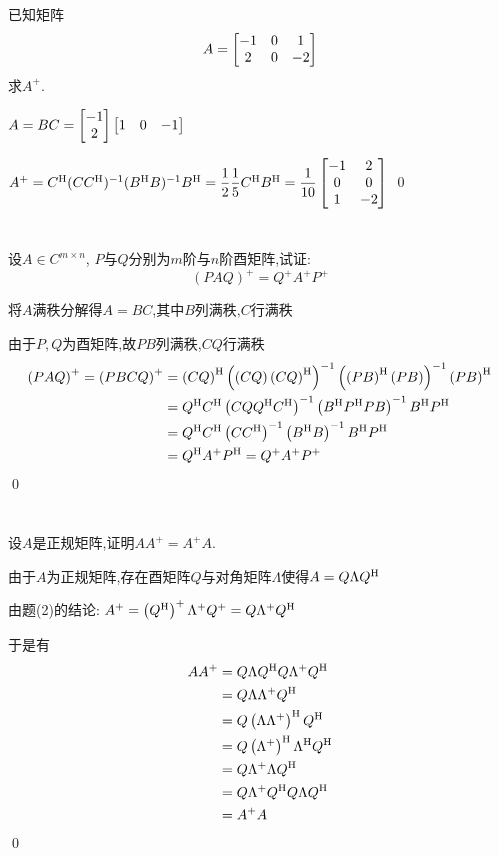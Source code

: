 \documentclass{matrix-homework}
\begin{document}

\section{}
已知矩阵$$A=\begin{bmatrix}-1&0&1\\2&0&-2\end{bmatrix}$$求$A^+$.

\answer
$A=BC=\begin{bmatrix}-1\\2\end{bmatrix}\begin{bmatrix}1&0&-1\end{bmatrix}$

$A^+=C^{\mathrm{H}} (CC^{\mathrm{H}})^{-1}(B^{\mathrm{H}} B)^{-1}B^{\mathrm{H}}=\dfrac{1}{2}\dfrac{1}{5}C^{\mathrm{H}} B^{\mathrm{H}}=\dfrac{1}{10}\begin{bmatrix}-1&2\\0&0\\1&-2\end{bmatrix}$
\qed


\section{}
设$A\in C^{m\times n}$, $P$与$Q$分别为$m$阶与$n$阶酉矩阵,试证:$$(PAQ)^+=Q^+A^+P^+$$

\answer
将$A$满秩分解得$A=BC$,其中$B$列满秩,$C$行满秩

由于$P,Q$为酉矩阵,故$PB$列满秩,$CQ$行满秩
\begin{align*}
    \left(PAQ\right)^+
    =\left(PBCQ\right)^+
     & =\left(CQ\right)^{\mathrm{H}} \left(\left(CQ\right)\left(CQ\right)^{\mathrm{H}}\right)^{-1} \left(\left(PB\right)^{\mathrm{H}}\left(PB\right)\right)^{-1}\left(PB\right)^{\mathrm{H}} \\
     & =Q^{\mathrm{H}} C^{\mathrm{H}} \left(CQQ^{\mathrm{H}} C^{\mathrm{H}}\right)^{-1} \left(B^{\mathrm{H}} P^{\mathrm{H}} PB\right)^{-1}B^{\mathrm{H}} P^{\mathrm{H}}                                                          \\
     & =Q^{\mathrm{H}} C^{\mathrm{H}} \left(CC^{\mathrm{H}}\right)^{-1}\left(B^{\mathrm{H}} B\right)^{-1}B^{\mathrm{H}} P^{\mathrm{H}}                                                                         \\
     & =Q^{\mathrm{H}} A^+P^{\mathrm{H}} = Q^+A^+P^+
\end{align*}
\qed

\newpage
\section{}
设$A$是正规矩阵,证明$AA^+=A^+A$.

\answer
由于$A$为正规矩阵,存在酉矩阵$Q$与对角矩阵$\Lambda$使得$A=Q\Lambda Q^{\mathrm{H}}$

由题(2)的结论: $A^+= \left(Q^{\mathrm{H}}\right)^+\Lambda^+Q^+= Q \Lambda^+ Q^{\mathrm{H}}$

于是有
\begin{align*}
    AA^+ & = Q\Lambda Q^{\mathrm{H}} Q \Lambda^+ Q^{\mathrm{H}}              \\
         & = Q\Lambda \Lambda^+ Q^{\mathrm{H}}                      \\
         & = Q\left(\Lambda\Lambda^+\right)^{\mathrm{H}} Q^{\mathrm{H}}      \\
         & = Q\left(\Lambda^+\right)^{\mathrm{H}} \Lambda^{\mathrm{H}} Q^{\mathrm{H}} \\
         & = Q\Lambda^+ \Lambda Q^{\mathrm{H}}                      \\
         & = Q\Lambda^+ Q^{\mathrm{H}} Q\Lambda Q^{\mathrm{H}}               \\
         & = A^+A
\end{align*}
\qed
\end{document}
